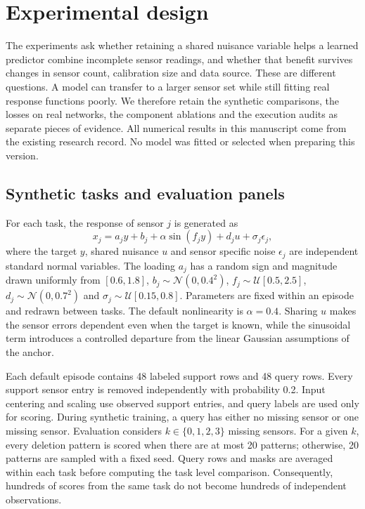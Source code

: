 \section{Experimental design}
\label{sec:experiments}
\label{sec:exp-setup}

The experiments ask whether retaining a shared nuisance variable helps a learned predictor combine incomplete sensor readings, and whether that benefit survives changes in sensor count, calibration size and data source. These are different questions. A model can transfer to a larger sensor set while still fitting real response functions poorly. We therefore retain the synthetic comparisons, the losses on real networks, the component ablations and the execution audits as separate pieces of evidence. All numerical results in this manuscript come from the existing research record. No model was fitted or selected when preparing this version.

\subsection{Synthetic tasks and evaluation panels}

For each task, the response of sensor $j$ is generated as
\begin{equation}
 x_j=a_jy+b_j+\alpha\sin(f_jy)+d_ju+\sigma_j\epsilon_j,
 \label{eq:experimental-generator}
\end{equation}
where the target $y$, shared nuisance $u$ and sensor specific noise $\epsilon_j$ are independent standard normal variables. The loading $a_j$ has a random sign and magnitude drawn uniformly from $[0.6,1.8]$, $b_j\sim\mathcal{N}(0,0.4^2)$, $f_j\sim\mathcal{U}[0.5,2.5]$, $d_j\sim\mathcal{N}(0,0.7^2)$ and $\sigma_j\sim\mathcal{U}[0.15,0.8]$. Parameters are fixed within an episode and redrawn between tasks. The default nonlinearity is $\alpha=0.4$. Sharing $u$ makes the sensor errors dependent even when the target is known, while the sinusoidal term introduces a controlled departure from the linear Gaussian assumptions of the anchor.

Each default episode contains 48 labeled support rows and 48 query rows. Every support sensor entry is removed independently with probability 0.2. Input centering and scaling use observed support entries, and query labels are used only for scoring. During synthetic training, a query has either no missing sensor or one missing sensor. Evaluation considers $k\in\{0,1,2,3\}$ missing sensors. For a given $k$, every deletion pattern is scored when there are at most 20 patterns; otherwise, 20 patterns are sampled with a fixed seed. Query rows and masks are averaged within each task before computing the task level comparison. Consequently, hundreds of scores from the same task do not become hundreds of independent observations.

